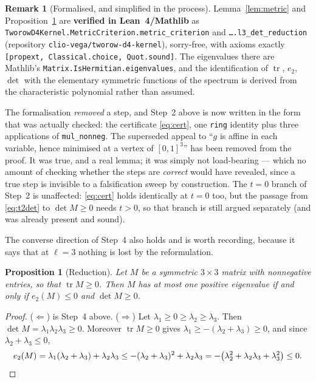 \documentclass[11pt]{article}
\theoremstyle{plain}
\newtheorem{proposition}[theorem]{Proposition}
\theoremstyle{definition}
\newtheorem{remark}[theorem]{Remark}
\DeclareMathOperator{\tr}{tr}
\begin{document}
\begin{remark}[Formalised, and simplified in the process]\label{rem:lean}
Lemma~\ref{lem:metric} and Proposition~\ref{prop:reduction} are \textbf{verified in Lean~4/Mathlib}
as \texttt{TworowD4Kernel.MetricCriterion.metric\_criterion} and
\texttt{\dots.l3\_det\_reduction} (repository \texttt{clio-vega/tworow-d4-kernel}), sorry-free, with
axioms exactly \texttt{[propext, Classical.choice, Quot.sound]}. The eigenvalues there are Mathlib's
\texttt{Matrix.IsHermitian.eigenvalues}, and the identification of $\tr$, $e_2$, $\det$ with the
elementary symmetric functions of the spectrum is derived from the characteristic polynomial rather
than assumed.

The formalisation \emph{removed} a step, and Step~2 above is now written in the form that was
actually checked: the certificate \eqref{eq:cert}, one \texttt{ring} identity plus three
applications of \texttt{mul\_nonneg}. The superseded appeal to ``$g$ is affine in each variable,
hence minimised at a vertex of $[0,1]^3$'' has been removed from the proof. It was true, and a real
lemma; it was simply not load-bearing --- which no amount of checking whether the steps are
\emph{correct} would have revealed, since a true step is invisible to a falsification sweep by
construction. The $t=0$ branch of Step~2 is unaffected: \eqref{eq:cert} holds identically at $t=0$
too, but the passage from \eqref{eq:t2det} to $\det M\ge0$ needs $t>0$, so that branch is still
argued separately (and was already present and sound).
\end{remark}

The converse direction of Step~4 also holds and is worth recording, because it says that at
$\ell=3$ nothing is lost by the reformulation.

\begin{proposition}[Reduction]\label{prop:reduction}
Let $M$ be a symmetric $3\times3$ matrix with nonnegative entries, so that $\tr M\ge0$. Then $M$ has
at most one positive eigenvalue if and only if $e_2(M)\le0$ and $\det M\ge0$.
\end{proposition}

\begin{proof}
($\Leftarrow$) is Step~4 above. ($\Rightarrow$) Let $\lambda_1\ge0\ge\lambda_2\ge\lambda_3$. Then
$\det M=\lambda_1\lambda_2\lambda_3\ge0$. Moreover $\tr M\ge0$ gives
$\lambda_1\ge-(\lambda_2+\lambda_3)\ge0$, and since $\lambda_2+\lambda_3\le0$,
\[
e_2(M)=\lambda_1(\lambda_2+\lambda_3)+\lambda_2\lambda_3
\le-(\lambda_2+\lambda_3)^2+\lambda_2\lambda_3=-\big(\lambda_2^2+\lambda_2\lambda_3+\lambda_3^2\big)\le0 . \qedhere
\]
\end{proof}
\end{document}
